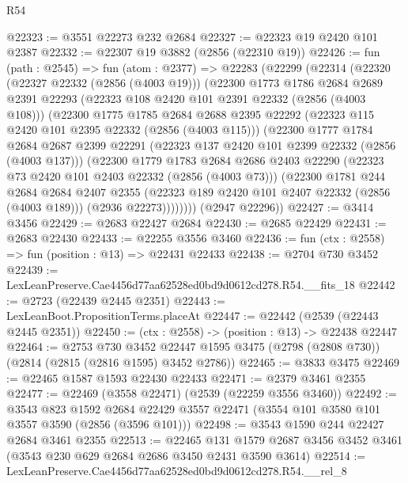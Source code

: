 \begin{lexlean}{R54}
\begin{coremodule}
@22323 := @3551 @22273 @232 @2684
@22327 := @22323 @19 @2420 @101 @2387
@22332 := @22307 @19 @3882 (@2856 (@22310 @19))
@22426 := fun (path : @2545) =>
  fun (atom : @2377) =>
  @22283
    (@22299
      (@22314
        (@22320
          (@22327 @22332 (@2856 (@4003 @19)))
          (@22300
            @1773
            @1786
            @2684
            @2689
            @2391
            @22293
            (@22323 @108 @2420 @101 @2391 @22332 (@2856 (@4003 @108)))
            (@22300
              @1775
              @1785
              @2684
              @2688
              @2395
              @22292
              (@22323 @115 @2420 @101 @2395 @22332 (@2856 (@4003 @115)))
              (@22300
                @1777
                @1784
                @2684
                @2687
                @2399
                @22291
                (@22323 @137 @2420 @101 @2399 @22332 (@2856 (@4003 @137)))
                (@22300
                  @1779
                  @1783
                  @2684
                  @2686
                  @2403
                  @22290
                  (@22323 @73 @2420 @101 @2403 @22332 (@2856 (@4003 @73)))
                  (@22300
                    @1781
                    @244
                    @2684
                    @2684
                    @2407
                    @2355
                    (@22323 @189 @2420 @101 @2407 @22332 (@2856 (@4003 @189)))
                    (@2936 @22273))))))))
      (@2947 @22296))
@22427 := @3414 @3456
@22429 := @2683 @22427 @2684
@22430 := @2685 @22429
@22431 := @2683 @22430
@22433 := @22255 @3556 @3460
@22436 := fun (ctx : @2558) => fun (position : @13) => @22431 @22433
@22438 := @2704 @730 @3452
@22439 := LexLeanPreserve.Cae4456d77aa62528ed0bd9d0612cd278.R54.__fits_18
@22442 := @2723 (@22439 @2445 @2351)
@22443 := LexLeanBoot.PropositionTerms.placeAt
@22447 := @22442 (@2539 (@22443 @2445 @2351))
@22450 := (ctx : @2558) -> (position : @13) -> @22438 @22447
@22464 := @2753
    @730
    @3452
    @22447
    @1595
    @3475
    (@2798 (@2808 @730))
    (@2814 (@2815 (@2816 @1595) @3452 @2786))
@22465 := @3833 @3475
@22469 := @22465 @1587 @1593 @22430 @22433
@22471 := @2379 @3461 @2355
@22477 := @22469 (@3558 @22471) (@2539 (@22259 @3556 @3460))
@22492 := @3543
    @823
    @1592
    @2684
    @22429
    @3557
    @22471
    (@3554 @101 @3580 @101 @3557 @3590 (@2856 (@3596 @101)))
@22498 := @3543 @1590 @244 @22427 @2684 @3461 @2355
@22513 := @22465
    @131
    @1579
    @2687
    @3456
    @3452
    @3461
    (@3543 @230 @629 @2684 @2686 @3450 @2431 @3590 @3614)
@22514 := LexLeanPreserve.Cae4456d77aa62528ed0bd9d0612cd278.R54.__rel_8

\end{coremodule}
\end{lexlean}
